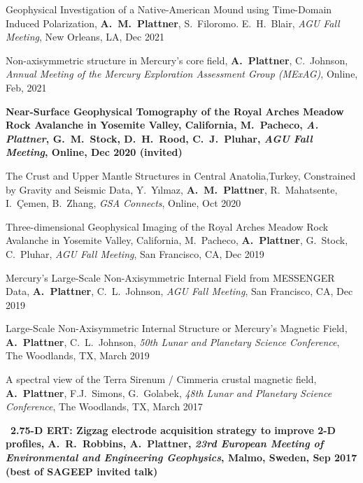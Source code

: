 \documentclass[10pt]{article}
\begin{document}
\spcp
Geophysical Investigation of a Native-American Mound using Time-Domain Induced Polarization, \textbf{A.~M.~Plattner}, S.~Filoromo. E.~H.~Blair, \emph{AGU Fall Meeting}, New Orleans, LA, Dec 2021


\spcp
Non-axisymmetric structure in Mercury's core field, \textbf{A.~Plattner}, C.~Johnson, \emph{Annual Meeting of the Mercury Exploration Assessment Group (MExAG)}, Online, Feb, 2021

\spcp
\hspace{-0.4cm} \gr \hspace{-0.03cm} \textbf{Near-Surface Geophysical Tomography of the Royal Arches Meadow Rock Avalanche in Yosemite Valley, California, M.~Pacheco, \emph{A. Plattner}, G.~M.~Stock, D.~H.~Rood, C.~J.~Pluhar, \emph{AGU Fall Meeting}, Online, Dec 2020 (invited)}

\spcp
\hspace{-0.4cm} \gr \hspace{-0.03cm} The Crust and Upper Mantle Structures in Central Anatolia,Turkey, Constrained by Gravity and Seismic Data, Y.~Y\i lmaz, \textbf{A.~M.~Plattner}, R.~Mahatsente, I.~\c Cemen, B.~Zhang, \emph{GSA Connects}, Online, Oct 2020

\spcp
\hspace{-0.4cm} \gr \hspace{-0.03cm} Three-dimensional Geophysical Imaging of the Royal Arches Meadow Rock Avalanche in Yosemite Valley, California, M.~Pacheco, \textbf{A.~Plattner}, G.~Stock, C.~Pluhar, \emph{AGU Fall Meeting}, San Francisco, CA, Dec 2019

\spcp
Mercury's Large-Scale Non-Axisymmetric Internal Field from MESSENGER Data, \textbf{A.~Plattner}, C.~L.~Johnson, \emph{AGU Fall Meeting}, San Francisco, CA, Dec 2019

\spcp
Large-Scale Non-Axisymmetric Internal Structure or Mercury's Magnetic Field,
\textbf{A.~Plattner}, C.~L.~Johnson, \emph{50th Lunar and Planetary Science Conference},
The Woodlands, TX, March 2019

\spcp
A spectral view of the Terra Sirenum / Cimmeria crustal magnetic field, \textbf{A.~Plattner}, F.J.~Simons, G.~Golabek, \emph{48th Lunar and Planetary Science Conference}, The Woodlands, TX, March 2017

\spcp 
\hspace{-0.4cm}\ug \, \textbf{2.75-D ERT: Zigzag electrode acquisition strategy
to improve 2-D profiles,
A.~R.~Robbins, \textbf{A.~Plattner},
\emph{23rd European Meeting of Environmental and Engineering Geophysics}, Malmo, Sweden, Sep 2017 (best of SAGEEP invited talk)}
\end{document}
